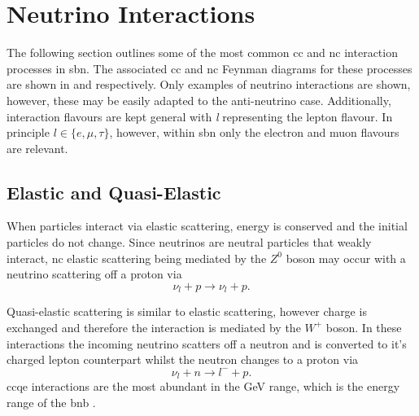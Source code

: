 \section{Neutrino Interactions}\label{sec:neutrino_interactions}

The following section outlines some of the most common \gls{cc} and \gls{nc} interaction processes in \gls{sbn}. The associated \gls{cc} and \gls{nc} Feynman diagrams for these processes are shown in  and  respectively. Only examples of neutrino interactions are shown, however, these may be easily adapted to the anti-neutrino case. Additionally, interaction flavours are kept general with \textit{l} representing the lepton flavour. In principle $l \in \{e, \mu, \tau\}$, however, within \gls{sbn} only the electron and muon flavours are relevant. 

\subsection*{Elastic and Quasi-Elastic}
When particles interact via elastic scattering, energy is conserved and the initial particles do not change. Since neutrinos are neutral particles that weakly interact, \gls{nc} elastic scattering being mediated by the $Z^0$ boson may occur with a neutrino scattering off a proton via
\begin{equation}
    \nu_l + p \rightarrow \nu_l + p.
\end{equation}

Quasi-elastic scattering is similar to elastic scattering, however charge is exchanged and therefore the interaction is mediated by the $W^+$ boson. In these interactions the incoming neutrino scatters off a neutron and is converted to it's charged lepton counterpart whilst the neutron changes to a proton via
\begin{equation}
    \nu_l + n \rightarrow l^- + p.
\end{equation}
\gls{ccqe} interactions are the most abundant in the GeV range, which is the energy range of the \gls{bnb} \cite{Measurement_of_the_Antineutrino_Double-Differential_Charged-Current_Quasi-Elastic_Scattering_Cross_Section_at_MINERvA_book}. 

